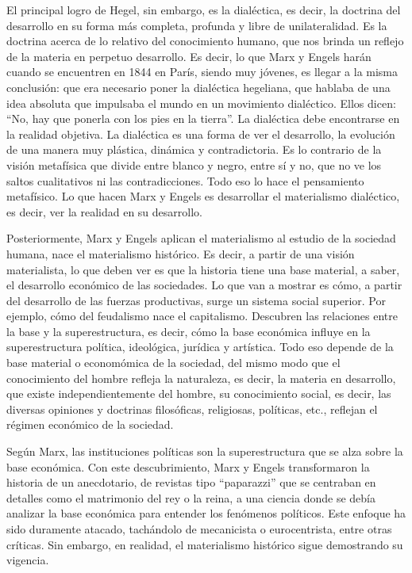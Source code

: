 \documentclass[
  jou,
  floatsintext,
  longtable,
  a4paper,
  nolmodern,
  notxfonts,
  notimes,
  12pt,
  colorlinks=true,linkcolor=blue,citecolor=blue,urlcolor=blue]{apa7}
\begin{document}
El principal logro de Hegel, sin embargo, es la dialéctica, es decir, la
doctrina del desarrollo en su forma más completa, profunda y libre de
unilateralidad. Es la doctrina acerca de lo relativo del conocimiento
humano, que nos brinda un reflejo de la materia en perpetuo desarrollo.
Es decir, lo que Marx y Engels harán cuando se encuentren en 1844 en
París, siendo muy jóvenes, es llegar a la misma conclusión: que era
necesario poner la dialéctica hegeliana, que hablaba de una idea
absoluta que impulsaba el mundo en un movimiento dialéctico. Ellos
dicen: ``No, hay que ponerla con los pies en la tierra''. La dialéctica
debe encontrarse en la realidad objetiva. La dialéctica es una forma de
ver el desarrollo, la evolución de una manera muy plástica, dinámica y
contradictoria. Es lo contrario de la visión metafísica que divide entre
blanco y negro, entre sí y no, que no ve los saltos cualitativos ni las
contradicciones. Todo eso lo hace el pensamiento metafísico. Lo que
hacen Marx y Engels es desarrollar el materialismo dialéctico, es decir,
ver la realidad en su desarrollo.

Posteriormente, Marx y Engels aplican el materialismo al estudio de la
sociedad humana, nace el materialismo histórico. Es decir, a partir de
una visión materialista, lo que deben ver es que la historia tiene una
base material, a saber, el desarrollo económico de las sociedades. Lo
que van a mostrar es cómo, a partir del desarrollo de las fuerzas
productivas, surge un sistema social superior. Por ejemplo, cómo del
feudalismo nace el capitalismo. Descubren las relaciones entre la base y
la superestructura, es decir, cómo la base económica influye en la
superestructura política, ideológica, jurídica y artística. Todo eso
depende de la base material o economómica de la sociedad, del mismo modo
que el conocimiento del hombre refleja la naturaleza, es decir, la
materia en desarrollo, que existe independientemente del hombre, su
conocimiento social, es decir, las diversas opiniones y doctrinas
filosóficas, religiosas, políticas, etc., reflejan el régimen económico
de la sociedad.

Según Marx, las instituciones políticas son la superestructura que se
alza sobre la base económica. Con este descubrimiento, Marx y Engels
transformaron la historia de un anecdotario, de revistas tipo
``paparazzi'' que se centraban en detalles como el matrimonio del rey o
la reina, a una ciencia donde se debía analizar la base económica para
entender los fenómenos políticos. Este enfoque ha sido duramente
atacado, tachándolo de mecanicista o eurocentrista, entre otras
críticas. Sin embargo, en realidad, el materialismo histórico sigue
demostrando su vigencia.
\end{document}
